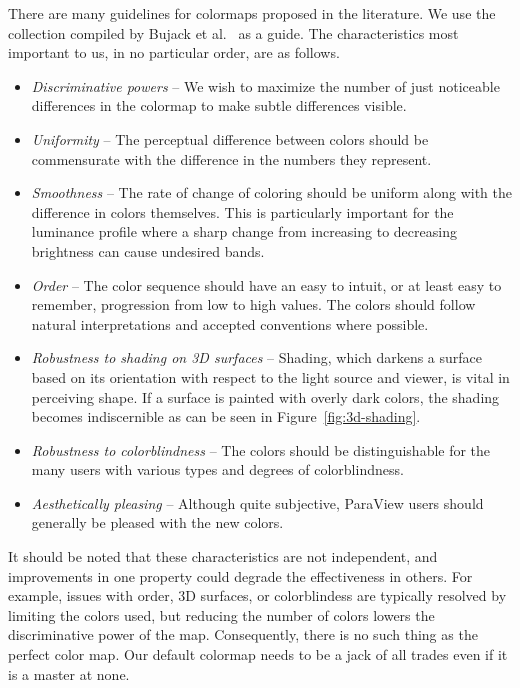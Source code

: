 \documentclass{IEEEcsmag}
\begin{document}
There are many guidelines for colormaps proposed in the literature. We use the collection compiled by Bujack et al.~\cite{Bujack2018} as a guide. The characteristics most important to us, in no particular order, are as follows.

\begin{itemize}
    
\item \emph{Discriminative powers} --
  We wish to maximize the number of just noticeable differences in the colormap to make subtle differences visible.
\item \emph{Uniformity} --
  The perceptual difference between colors should be commensurate with the difference in the numbers they represent.
\item \emph{Smoothness} --
  The rate of change of coloring should be uniform along with the difference in colors themselves.
  This is particularly important for the luminance profile where a sharp change from increasing to decreasing brightness can cause undesired bands.
\item \emph{Order} --
  The color sequence should have an easy to intuit, or at least easy to remember, progression from low to high values.
  The colors should follow natural interpretations and accepted conventions where possible.
\item \emph{Robustness to shading on 3D surfaces} --
  Shading, which darkens a surface based on its orientation with respect to the light source and viewer, is vital in perceiving shape.
  If a surface is painted with overly dark colors, the shading becomes indiscernible as can be seen in Figure~\ref{fig:3d-shading}.
\item \emph{Robustness to colorblindness} --
  The colors should be distinguishable for the many users with various types and degrees of colorblindness.
\item \emph{Aesthetically pleasing} --
  Although quite subjective, ParaView users should generally be pleased with the new colors.

\end{itemize}

It should be noted that these characteristics are not independent, and improvements in one property could degrade the effectiveness in others. For example, issues with order, 3D surfaces, or colorblindess are typically resolved by limiting the colors used, but reducing the number of colors lowers the discriminative power of the map. Consequently, there is no such thing as the perfect color map. Our default colormap needs to be a jack of all trades even if it is a master at none.
\end{document}
